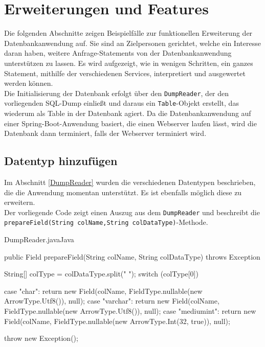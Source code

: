 \section{Erweiterungen und Features}
\label{erweitern}

Die folgenden Abschnitte zeigen Beispielfälle zur funktionellen Erweiterung der Datenbankanwendung auf. Sie sind an Zielpersonen gerichtet, welche ein Interesse daran haben, weitere Anfrage-Statements von der Datenbankanwendung unterstützen zu lassen. Es wird aufgezeigt, wie in wenigen Schritten, ein ganzes Statement, mithilfe der verschiedenen Services, interpretiert und ausgewertet werden können.\\
Die Initialisierung der Datenbank erfolgt über den \texttt{DumpReader}, der den vorliegenden SQL-Dump einließt und daraus ein \texttt{Table}-Objekt erstellt, das wiederum  als Table in der Datenbank agiert.
Da die Datenbankanwendung auf einer Spring-Boot-Anwendung basiert, die einen Webserver laufen lässt, wird die Datenbank dann terminiert, falls der Webserver terminiert wird. 

\subsection{Datentyp hinzufügen}
Im Abschnitt \ref{DumpReader} wurden die verschiedenen Datentypen beschrieben, die die Anwendung momentan unterstützt. Es ist ebenfalls möglich diese zu erweitern.\\
Der vorliegende Code zeigt einen Auszug aus dem \texttt{DumpReader} und beschreibt die \texttt{prepareField(String colName,String colDataType)}-Methode.

\begin{codeblock}{DumpReader.java}{Java}
  \begin{javacode}
public Field prepareField(String colName, String colDataType) throws Exception {
        String[] colType = colDataType.split(" ");
        switch (colType[0]) {
            case "char":
                return new Field(colName, FieldType.nullable(new ArrowType.Utf8()), null);
            case "varchar":
                return new Field(colName, FieldType.nullable(new ArrowType.Utf8()), null);
            case "mediumint":
                return new Field(colName, FieldType.nullable(new ArrowType.Int(32, true)), null);

        }
        throw new Exception();
    }
  \end{javacode}
\end{codeblock}

